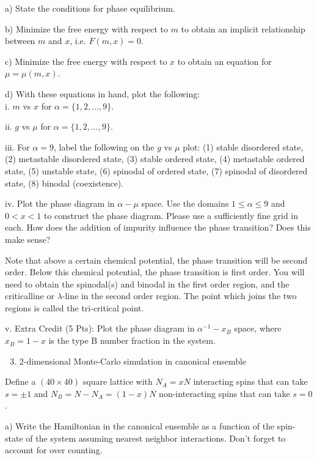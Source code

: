 \documentclass[12pt]{article}
\begin{document}
a) State the conditions for phase equilibrium.

b) Minimize the free energy with respect to $m$ to obtain an implicit relationship between $m$ and $x$, i.e. $F(m, x)=0$.

c) Minimize the free energy with respect to $x$ to obtain an equation for $\mu=\mu(m, x)$.

d) With these equations in hand, plot the following:\\
i. $m$ vs $x$ for $\alpha=\{1,2, \ldots, 9\}$.

ii. $g$ vs $\mu$ for $\alpha=\{1,2, \ldots, 9\}$.

iii. For $\alpha=9$, label the following on the $g$ vs $\mu$ plot: (1) stable disordered state, (2) metastable disordered state, (3) stable ordered state, (4) metastable ordered state, (5) unstable state, (6) spinodal of ordered state, (7) spinodal of disordered state, (8) binodal (coexistence).

iv. Plot the phase diagram in $\alpha-\mu$ space. Use the domains $1 \leq \alpha \leq 9$ and $0<x<1$ to construct the phase diagram. Please use a sufficiently fine grid in each. How does the addition of impurity influence the phase transition? Does this make sense?

Note that above a certain chemical potential, the phase transition will be second order. Below this chemical potential, the phase transition is first order. You will need to obtain the spinodal(s) and binodal in the first order region, and the criticalline or $\lambda$-line in the second order region. The point which joins the two regions is called the tri-critical point.

v. Extra Credit (5 Pts): Plot the phase diagram in $\alpha^{-1}-x_{B}$ space, where $x_{B}=1-x$ is the type B number fraction in the system.

\begin{enumerate}
  \setcounter{enumi}{2}
  \item 2-dimensional Monte-Carlo simulation in canonical ensemble
\end{enumerate}

Define a $(40 \times 40)$ square lattice with $N_{A}=x N$ interacting spins that can take $s= \pm 1$ and $N_{B}=N-N_{A}=(1-x) N$ non-interacting spins that can take $s=0$.

a) Write the Hamiltonian in the canonical ensemble as a function of the spin-state of the system assuming nearest neighbor interactions. Don't forget to account for over counting.
\end{document}
